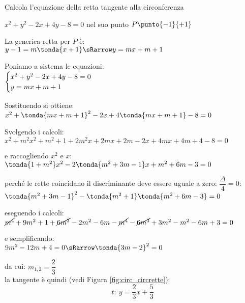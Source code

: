 \begin{esempio}
Calcola l'equazione della retta tangente alla circonferenza 

\(x^2 +y^2 -2x +4y -8 = 0\) nel suo punto \(P \punto{-1}{+1}\) 

La generica retta per \(P\) è: \\
\(y -1 = m \tonda{x +1} \sRarrow y = mx +m +1\)

Poniamo a sistema le equazioni: \\  
\(\begin{cases}x^2 + y^2 -2x +4y -8 = 0 \\ y = mx +m +1\end{cases}\) 

Sostituendo si ottiene: \\    
\(x^2 + \tonda{mx +m +1}^2 -2x +4\tonda{mx +m +1} -8 = 0\) 

Svolgendo i calcoli: \\    
\(x^2 + m^2x^2 +m^2 +1 +2m^2x +2mx +2m -2x +4mx +4m +4 -8 = 0\) 

e raccogliendo \(x^2\) e \(x\): \\    
\(\tonda{1 +m^2}x^2 -2\tonda{m^2 +3m -1}x +m^2 +6m -3 = 0\) 

perché le rette coincidano il discriminante deve essere 
uguale a zero: \(\dfrac{\Delta}{4} = 0\): \\ 
\(\tonda{m^2 +3m -1}^2 -\tonda{m^2 +1}\tonda{m^2 +6m -3} = 0\) 

eseguendo i calcoli: \\ 
\(\cancel{m^4} +9m^2 +1 +\cancel{6m^3} -2m^2 -6m -
\cancel{m^4} -\cancel{6m^3} +3m^2 -m^2 -6m +3 = 0\) 

e semplificando: \\ 
\(9m^2 -12m +4 = 0 \sRarrow \tonda{3m -2}^2 = 0\) 

da cui: \(m_{1,2} = \dfrac{2}{3} \)\\
la tangente è quindi (vedi Figura \ref{fig:circ_circrette}):
\[t:~y = \dfrac{2}{3}x +\dfrac{5}{3}\]
\end{esempio}

